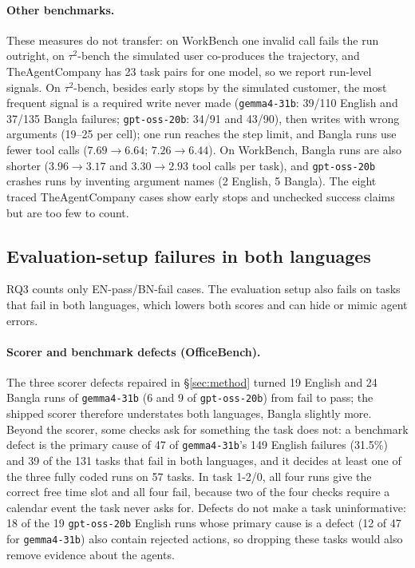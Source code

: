 \documentclass[11pt]{article}
\newcommand{\gemma}{\texttt{gemma4-31b}}
\newcommand{\gptoss}{\texttt{gpt-oss-20b}}
\newcommand{\OB}{OfficeBench}
\newcommand{\WB}{WorkBench}
\newcommand{\TAU}{$\tau^2$-bench}
\newcommand{\TAC}{TheAgentCompany}
\begin{document}
\paragraph{Other benchmarks.} These measures do not transfer: on \WB{} one invalid call fails the
run outright, on \TAU{} the simulated user co-produces the trajectory, and \TAC{} has 23 task pairs
for one model, so we report run-level signals. On \TAU{}, besides early stops by the simulated
customer, the most frequent signal is a required write never made (\gemma{}: 39/110 English and
37/135 Bangla failures; \gptoss{}: 34/91 and 43/90), then writes with wrong arguments (19--25 per
cell); one run reaches the step limit, and Bangla runs use fewer tool calls ($7.69\to6.64$;
$7.26\to6.44$). On \WB{}, Bangla runs are also shorter
($3.96\to3.17$ and $3.30\to2.93$ tool calls per task), and \gptoss{} crashes runs by inventing
argument names (2 English, 5 Bangla). The eight traced \TAC{} cases show early stops and unchecked
success claims but are too few to count.

\subsection{Evaluation-setup failures in both languages}
\label{sec:setup}

RQ3 counts only EN-pass/BN-fail cases. The evaluation setup also fails on tasks that fail in
both languages, which lowers both scores and can hide or mimic agent errors.

\paragraph{Scorer and benchmark defects (\OB{}).} The three scorer defects repaired in
\S\ref{sec:method} turned 19 English and 24 Bangla runs of \gemma{} (6 and 9 of \gptoss{}) from fail
to pass; the shipped scorer therefore understates both languages, Bangla slightly more. Beyond the
scorer, some checks ask for something the task does not: a benchmark defect is the primary cause of
47 of \gemma{}'s 149 English failures (31.5\%) and 39 of the 131 tasks that fail in both languages,
and it decides at least one of the three fully coded runs on 57 tasks. In task 1-2/0, all four runs
give the correct free time slot and all four fail, because two of the four checks require a
calendar event the task never asks for. Defects do not make a task uninformative: 18 of the 19
\gptoss{} English runs whose primary cause is a defect (12 of 47 for \gemma{}) also contain
rejected actions, so dropping these tasks would also remove evidence about the agents.
\end{document}
